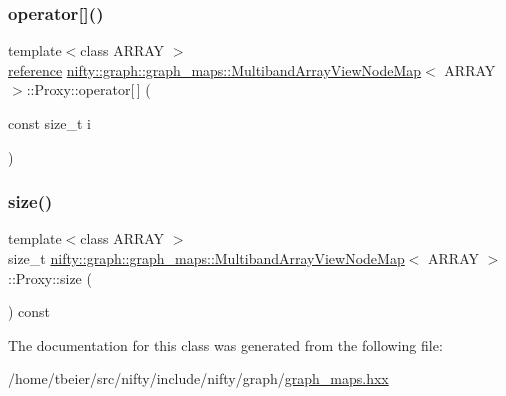 \mbox{\label{classnifty_1_1graph_1_1graph__maps_1_1MultibandArrayViewNodeMap_1_1Proxy_a38bae30fe7f27638ef27fc7dddb2a7da}} 
\subsubsection{\texorpdfstring{operator[]()}{operator[]()}\hspace{0.1cm}{\footnotesize\ttfamily [2/2]}}
{\footnotesize\ttfamily template$<$class A\+R\+R\+AY $>$ \\
\hyperlink{structnifty_1_1graph_1_1graph__maps_1_1MultibandArrayViewNodeMap_ae8a745152ddc0f45748a17dc130403f6}{reference} \hyperlink{structnifty_1_1graph_1_1graph__maps_1_1MultibandArrayViewNodeMap}{nifty\+::graph\+::graph\+\_\+maps\+::\+Multiband\+Array\+View\+Node\+Map}$<$ A\+R\+R\+AY $>$\+::Proxy\+::operator\mbox{[}$\,$\mbox{]} (\begin{DoxyParamCaption}\item[{const size\+\_\+t}]{i }\end{DoxyParamCaption})\hspace{0.3cm}{\ttfamily [inline]}}

\mbox{\label{classnifty_1_1graph_1_1graph__maps_1_1MultibandArrayViewNodeMap_1_1Proxy_ab3cc03e963c331e47951424034304dc2}} 
\subsubsection{\texorpdfstring{size()}{size()}}
{\footnotesize\ttfamily template$<$class A\+R\+R\+AY $>$ \\
size\+\_\+t \hyperlink{structnifty_1_1graph_1_1graph__maps_1_1MultibandArrayViewNodeMap}{nifty\+::graph\+::graph\+\_\+maps\+::\+Multiband\+Array\+View\+Node\+Map}$<$ A\+R\+R\+AY $>$\+::Proxy\+::size (\begin{DoxyParamCaption}{ }\end{DoxyParamCaption}) const\hspace{0.3cm}{\ttfamily [inline]}}



The documentation for this class was generated from the following file\+:\begin{DoxyCompactItemize}
\item 
/home/tbeier/src/nifty/include/nifty/graph/\hyperlink{graph__maps_8hxx}{graph\+\_\+maps.\+hxx}\end{DoxyCompactItemize}
